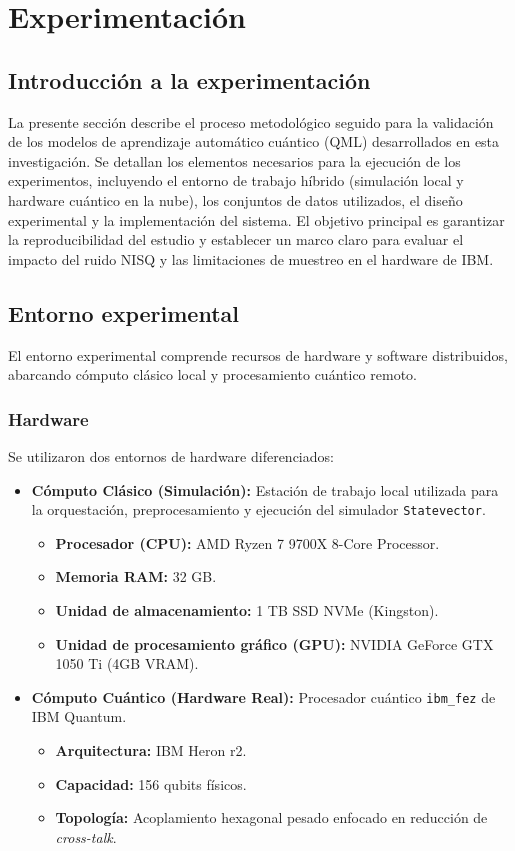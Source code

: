 \section{Experimentaci\'on}
\label{sec:experimentacion}

\subsection{Introducci\'on a la experimentaci\'on}
La presente secci\'on describe el proceso metodol\'ogico seguido para la validaci\'on de los modelos de aprendizaje autom\'atico cu\'antico (QML) desarrollados en esta investigaci\'on. Se detallan los elementos necesarios para la ejecuci\'on de los experimentos, incluyendo el entorno de trabajo h\'ibrido (simulaci\'on local y hardware cu\'antico en la nube), los conjuntos de datos utilizados, el dise\~no experimental y la implementaci\'on del sistema. El objetivo principal es garantizar la reproducibilidad del estudio y establecer un marco claro para evaluar el impacto del ruido NISQ y las limitaciones de muestreo en el hardware de IBM.

\subsection{Entorno experimental}
El entorno experimental comprende recursos de hardware y software distribuidos, abarcando c\'omputo cl\'asico local y procesamiento cu\'antico remoto.

\subsubsection{Hardware}
Se utilizaron dos entornos de hardware diferenciados:
\begin{itemize}
    \item \textbf{C\'omputo Cl\'asico (Simulaci\'on):} Estaci\'on de trabajo local utilizada para la orquestaci\'on, preprocesamiento y ejecuci\'on del simulador \texttt{Statevector}.
    \begin{itemize}
        \item \textbf{Procesador (CPU):} AMD Ryzen 7 9700X 8-Core Processor.
        \item \textbf{Memoria RAM:} 32 GB.
        \item \textbf{Unidad de almacenamiento:} 1 TB SSD NVMe (Kingston).
        \item \textbf{Unidad de procesamiento gr\'afico (GPU):} NVIDIA GeForce GTX 1050 Ti (4GB VRAM).
    \end{itemize}
    \item \textbf{C\'omputo Cu\'antico (Hardware Real):} Procesador cu\'antico \texttt{ibm\_fez} de IBM Quantum.
    \begin{itemize}
        \item \textbf{Arquitectura:} IBM Heron r2.
        \item \textbf{Capacidad:} 156 qubits f\'isicos.
        \item \textbf{Topolog\'ia:} Acoplamiento hexagonal pesado enfocado en reducci\'on de \textit{cross-talk}.
    \end{itemize}
\end{itemize}

